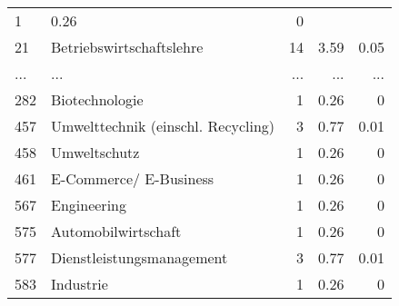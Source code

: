 \begin{longtable}{lXrrr}
          \num{1} &
          \num[round-mode=places,round-precision=2]{0.26} &
          \num[round-mode=places,round-precision=2]{0} \\
        21 & \multicolumn{1}{X}{Betriebswirtschaftslehre} & %
          \num{14} &
          \num[round-mode=places,round-precision=2]{3.59} &
          \num[round-mode=places,round-precision=2]{0.05} \\
       ... & ... & ... & ... & ... \\
        282 & \multicolumn{1}{X}{Biotechnologie} & %
          \num{1} &
          \num[round-mode=places,round-precision=2]{0.26} &
          \num[round-mode=places,round-precision=2]{0} \\

        457 & \multicolumn{1}{X}{Umwelttechnik (einschl. Recycling)} & %
          \num{3} &
          \num[round-mode=places,round-precision=2]{0.77} &
          \num[round-mode=places,round-precision=2]{0.01} \\

        458 & \multicolumn{1}{X}{Umweltschutz} & %
          \num{1} &
          \num[round-mode=places,round-precision=2]{0.26} &
          \num[round-mode=places,round-precision=2]{0} \\

        461 & \multicolumn{1}{X}{E-Commerce/ E-Business} & %
          \num{1} &
          \num[round-mode=places,round-precision=2]{0.26} &
          \num[round-mode=places,round-precision=2]{0} \\

        567 & \multicolumn{1}{X}{Engineering} & %
          \num{1} &
          \num[round-mode=places,round-precision=2]{0.26} &
          \num[round-mode=places,round-precision=2]{0} \\

        575 & \multicolumn{1}{X}{Automobilwirtschaft} & %
          \num{1} &
          \num[round-mode=places,round-precision=2]{0.26} &
          \num[round-mode=places,round-precision=2]{0} \\

        577 & \multicolumn{1}{X}{Dienstleistungsmanagement} & %
          \num{3} &
          \num[round-mode=places,round-precision=2]{0.77} &
          \num[round-mode=places,round-precision=2]{0.01} \\

        583 & \multicolumn{1}{X}{Industrie} & %
          \num{1} &
          \num[round-mode=places,round-precision=2]{0.26} &
          \num[round-mode=places,round-precision=2]{0} \\


\end{longtable}
